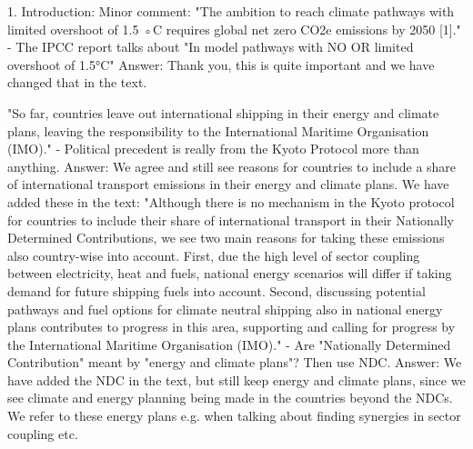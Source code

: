 1.	Introduction: 
Minor comment: "The ambition to reach climate pathways with limited overshoot of 1.5 ◦C requires global net zero CO2e emissions by 2050 [1]." 
-	The IPCC report talks about "In model pathways with NO OR limited overshoot of 1.5°C"
Answer: Thank you, this is quite important and we have changed that in the text.

"So far, countries leave out international shipping in their energy and climate plans, leaving the responsibility to the International Maritime Organisation (IMO)."  
- Political precedent is really from the Kyoto Protocol more than anything.
Answer: We agree and still see reasons for countries to include a share of international transport emissions in their energy and climate plans. We have added these in the text: "Although there is no mechanism in the Kyoto protocol for countries to include their share of international transport in their Nationally Determined Contributions, we see two main reasons for taking these emissions also country-wise into account. First, due the high level of sector coupling between electricity, heat and fuels, national energy scenarios will differ if taking demand for future shipping fuels into account. Second, discussing potential pathways and fuel options for climate neutral shipping also in national energy plans contributes to progress in this area, supporting and calling for progress by the International Maritime Organisation (IMO)."
- Are "Nationally Determined Contribution" meant by "energy and climate plans"? Then use NDC.
Answer: We have added the NDC in the text, but still keep energy and climate plans, since we see climate and energy planning being made in the countries beyond the NDCs. We refer to these energy plans e.g. when talking about finding synergies in sector coupling etc.


